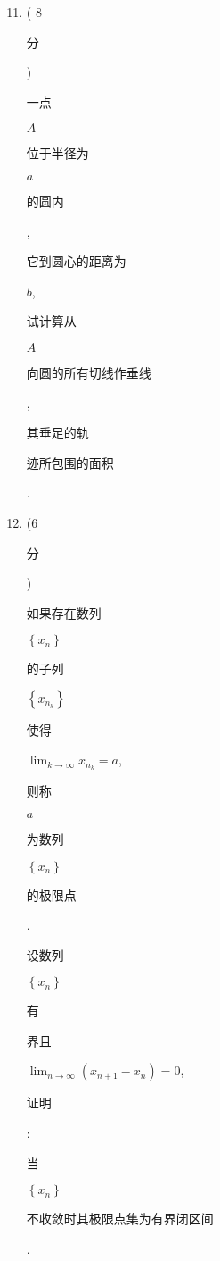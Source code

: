 \documentclass[10pt]{article}
\begin{document}
\begin{enumerate}
  \setcounter{enumi}{10}
  \item ( 8 \begin{CJK}{UTF8}{mj}分\end{CJK}) \begin{CJK}{UTF8}{mj}一点\end{CJK} $A$ \begin{CJK}{UTF8}{mj}位于半径为\end{CJK} $a$ \begin{CJK}{UTF8}{mj}的圆内\end{CJK}, \begin{CJK}{UTF8}{mj}它到圆心的距离为\end{CJK} $b$, \begin{CJK}{UTF8}{mj}试计算从\end{CJK} $A$ \begin{CJK}{UTF8}{mj}向圆的所有切线作垂线\end{CJK}, \begin{CJK}{UTF8}{mj}其垂足的轨\end{CJK} \begin{CJK}{UTF8}{mj}迹所包围的面积\end{CJK}.

  \item (6 \begin{CJK}{UTF8}{mj}分\end{CJK}) \begin{CJK}{UTF8}{mj}如果存在数列\end{CJK} $\left\{x_{n}\right\}$ \begin{CJK}{UTF8}{mj}的子列\end{CJK} $\left\{x_{n_{k}}\right\}$ \begin{CJK}{UTF8}{mj}使得\end{CJK} $\lim _{k \rightarrow \infty} x_{n_{k}}=a$, \begin{CJK}{UTF8}{mj}则称\end{CJK} $a$ \begin{CJK}{UTF8}{mj}为数列\end{CJK} $\left\{x_{n}\right\}$ \begin{CJK}{UTF8}{mj}的极限点\end{CJK}. \begin{CJK}{UTF8}{mj}设数列\end{CJK} $\left\{x_{n}\right\}$ \begin{CJK}{UTF8}{mj}有\end{CJK} \begin{CJK}{UTF8}{mj}界且\end{CJK} $\lim _{n \rightarrow \infty}\left(x_{n+1}-x_{n}\right)=0$, \begin{CJK}{UTF8}{mj}证明\end{CJK}: \begin{CJK}{UTF8}{mj}当\end{CJK} $\left\{x_{n}\right\}$ \begin{CJK}{UTF8}{mj}不收敛时其极限点集为有界闭区间\end{CJK}.

\end{enumerate}
\end{document}
